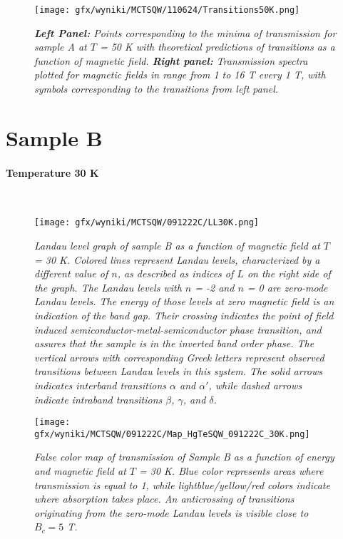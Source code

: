 \documentclass[titlepage,a4paper]{book}
\newcommand{\wciecie}{\quad\phantom{v}}
\newcommand{\myparagraph}[1]{\paragraph{#1}\mbox{}\\}
\begin{document}
\begin{figure}[H]
	\centering
	\texttt{[image: gfx/wyniki/MCTSQW/110624/Transitions50K.png]}
	\vspace{-10pt}
	\caption{\textit{\textbf{Left Panel:} Points corresponding to the minima of transmission for sample A at $T$ = 50 K with theoretical predictions of transitions as a function of magnetic field. \textbf{Right panel:} Transmission spectra plotted for magnetic fields in range from 1 to 16 T every 1 T, with symbols corresponding to the transitions from left panel.}}
	\label{fig:Transitions_110624_50K}
\end{figure}

\clearpage
\section{Sample B}
\myparagraph{Temperature 30 K}
\wciecie
\begin{figure}[H]
	\centering
	\texttt{[image: gfx/wyniki/MCTSQW/091222C/LL30K.png]}
	\vspace{-10pt}
	\caption{\textit{Landau level graph of sample B as a function of magnetic field at $T$ = 30 K. Colored lines represent Landau levels, characterized by a different value of $n$, as described as indices of $L$ on the right side of the graph. The Landau levels with $n$ = -2 and $n$ = 0 are zero-mode Landau levels. The energy of those levels at zero magnetic field is an indication of the band gap. Their crossing indicates the point of field induced semiconductor-metal-semiconductor phase transition, and assures that the sample is in the inverted band order phase. The vertical arrows with corresponding Greek letters represent observed transitions between Landau levels in this system. The solid arrows indicates interband transitions $\alpha$ and $\alpha'$, while dashed arrows indicate intraband transitions $\beta$, $\gamma$, and $\delta$.}}
	\label{fig:LL_SQW_30K}
\end{figure}

\begin{figure}[H]
	\centering
	\texttt{[image: gfx/wyniki/MCTSQW/091222C/Map\_HgTeSQW\_091222C\_30K.png]}
	\vspace{-10pt}
	\caption{\textit{False color map of transmission of Sample B as a function of energy and magnetic field at $T$ = 30 K. Blue color represents areas where transmission is equal to 1, while lightblue/yellow/red colors indicate where absorption takes place. An anticrossing of transitions originating from the zero-mode Landau levels is visible close to $B_c = 5$ T. }}
	\label{fig:Map_SQW_30K}
\end{figure}
\end{document}
